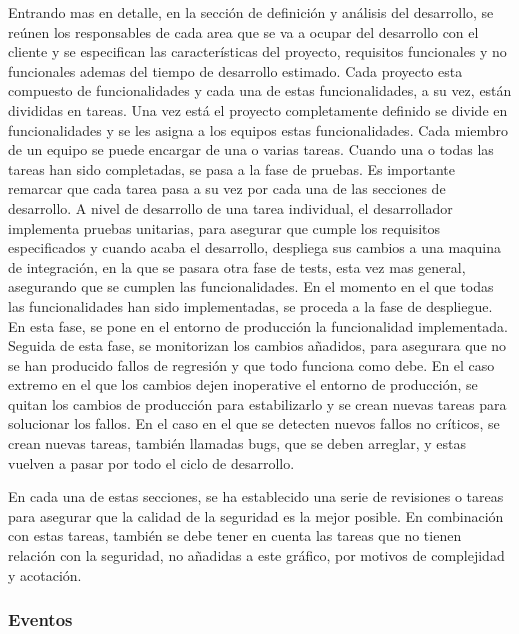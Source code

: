 \documentclass[12pt]{report} %
\begin{document}
Entrando mas en detalle, en la sección de definición y análisis del desarrollo,
se reúnen los responsables de cada area que se va a ocupar del desarrollo con el
cliente y se especifican las características del proyecto, requisitos
funcionales y no funcionales ademas del tiempo de desarrollo estimado.
Cada proyecto esta compuesto de funcionalidades y cada una de estas
funcionalidades, a su vez, están divididas en tareas.
Una vez está el proyecto completamente definido se divide en funcionalidades y
se les asigna a los equipos estas funcionalidades.
Cada miembro de un equipo se puede encargar de una o varias tareas. 
Cuando una o todas las tareas han sido completadas, se pasa a la fase de
pruebas.
Es importante remarcar que cada tarea pasa a su vez por cada una de las
secciones de desarrollo.
A nivel de desarrollo de una tarea individual, el desarrollador implementa
pruebas unitarias, para asegurar que cumple los requisitos especificados y
cuando acaba el desarrollo, despliega sus cambios a una maquina de integración,
en la que se pasara otra fase de tests, esta vez mas general, asegurando que se
cumplen las funcionalidades.
En el momento en el que todas las funcionalidades han sido implementadas, se
proceda a la fase de despliegue.
En esta fase, se pone en el entorno de producción la funcionalidad implementada.
Seguida de esta fase, se monitorizan los cambios añadidos, para asegurara que no
se han producido fallos de regresión y que todo funciona como debe.
En el caso extremo en el que los cambios dejen inoperative el entorno de
producción, se quitan los cambios de producción para estabilizarlo y se crean
nuevas tareas para solucionar los fallos.
En el caso en el que se detecten nuevos fallos no críticos, se crean nuevas
tareas, también llamadas bugs, que se deben arreglar, y estas vuelven a pasar
por todo el ciclo de desarrollo.

En cada una de estas secciones, se ha establecido una serie de revisiones o
tareas para asegurar que la calidad de la seguridad es la mejor posible.
En combinación con estas tareas, también se debe tener en cuenta las tareas que
no tienen relación con la seguridad, no añadidas a este gráfico, por motivos de
complejidad y acotación.

\subsubsection{Eventos}
\end{document}
